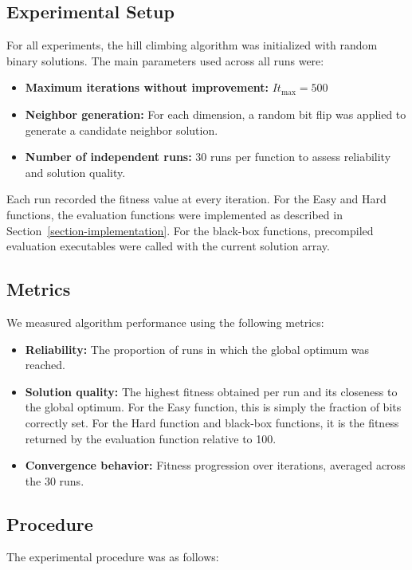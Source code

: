 \documentclass[11pt]{article}
\begin{document}
\subsection{Experimental Setup}
For all experiments, the hill climbing algorithm was initialized with random binary solutions. The main parameters used across all runs were:  

\begin{itemize}
    \item \textbf{Maximum iterations without improvement:} $It_\text{max} = 500$
    \item \textbf{Neighbor generation:} For each dimension, a random bit flip was applied to generate a candidate neighbor solution.
    \item \textbf{Number of independent runs:} 30 runs per function to assess reliability and solution quality.
\end{itemize}

Each run recorded the fitness value at every iteration. For the Easy and Hard functions, the evaluation functions were implemented as described in Section~\ref{section-implementation}. For the black-box functions, precompiled evaluation executables were called with the current solution array.

\subsection{Metrics}
We measured algorithm performance using the following metrics:

\begin{itemize}
    \item \textbf{Reliability:} The proportion of runs in which the global optimum was reached.
    \item \textbf{Solution quality:} The highest fitness obtained per run and its closeness to the global optimum. For the Easy function, this is simply the fraction of bits correctly set. For the Hard function and black-box functions, it is the fitness returned by the evaluation function relative to 100.
    \item \textbf{Convergence behavior:} Fitness progression over iterations, averaged across the 30 runs.
\end{itemize}

\subsection{Procedure}
The experimental procedure was as follows:
\end{document}
